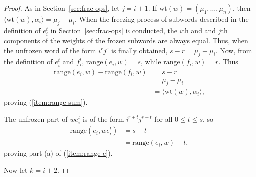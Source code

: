 \documentclass[12pt]{amsproc}
\newcommand{\range}{\mathrm{range}}
\newcommand{\wt}{\mathrm{wt}}
\theoremstyle{definition}
\begin{document}
\begin{proof}
  As in Section~\ref{sec:frac-ops}, let $j=i+1$.
  If $\wt(w)=(\mu_1,\dotsc,\mu_n)$, then $\langle\wt(w),\alpha_i\rangle=\mu_j-\mu_i$.
  When the freezing process of subwords described in the definition of $e_i^t$ in Section~\ref{sec:frac-ops} is conducted, the $i$th and and $j$th components of the weights of the frozen subwords are always equal.
  Thus, when the unfrozen word of the form $i^rj^s$ is finally obtained, $s-r=\mu_j-\mu_i$.
  Now, from the definition of $e_i^t$ and $f_i^t$, $\range(e_i,w)=s$, while $\range(f_i,w)=r$.
  Thus
  \begin{align*}
    \range(e_i,w)-\range(f_i,w) & = s - r\\
                                & = \mu_j-\mu_i\\
                                & = \langle\wt(w),\alpha_i\rangle,
  \end{align*}
  proving (\ref{item:range-sum}).
  
  The unfrozen part of $we_i^t$ is of the form $i^{r+t}j^{s-t}$ for all $0\leq t\leq s$, so
  \begin{align*}
    \range(e_i,we_i^t) & = s-t\\
    & = \range(e_i,w)-t,
  \end{align*}
  proving part (a) of (\ref{item:range-e}).

  Now let $k=i+2$.
  
\end{proof}
\end{document}
